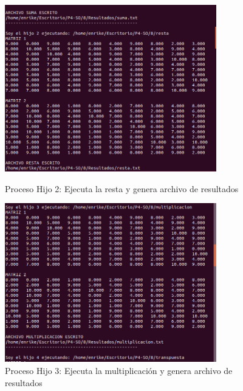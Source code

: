 \documentclass[12pt]{article}
\begin{document}
\begin{itemize}
\begin{figure}[h!]
                        
                        \includegraphics[width=0.82\textwidth]{Practica4/Images/Linux/8_2.png}
                        \caption{Proceso Hijo 2: Ejecuta la resta y genera archivo de resultados}
                        
                        \includegraphics[width=0.82\textwidth]{Practica4/Images/Linux/8_4.png}
                        \caption{Proceso Hijo 3: Ejecuta la multiplicación y genera archivo de resultados}
                        
                    \end{figure}
                    \clearpage
                    \begin{figure}[h!]
                        \centering
                        

\end{figure}
\end{itemize}
\end{document}

